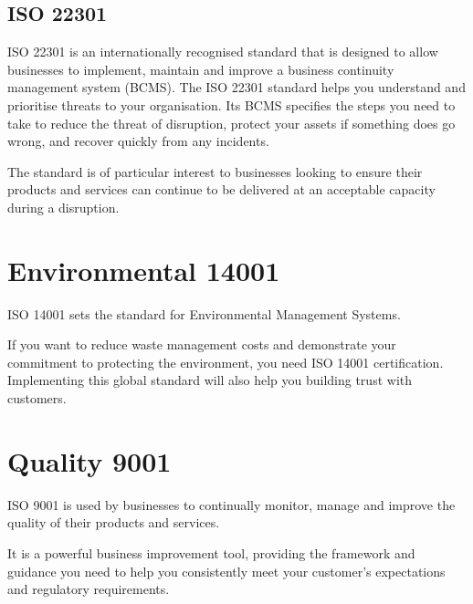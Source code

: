 \documentclass[a4paper,12pt]{article}
\begin{document}
\subsection{ISO 22301}

ISO 22301 is an internationally recognised standard that is designed to allow businesses to implement, maintain and improve a business continuity management system (BCMS). The ISO 22301 standard helps you understand and prioritise threats to your organisation. Its BCMS specifies the steps you need to take to reduce the threat of disruption, protect your assets if something does go wrong, and recover quickly from any incidents.

The standard is of particular interest to businesses looking to ensure their products and services can continue to be delivered at an acceptable capacity during a disruption.

\section{Environmental 14001}
ISO 14001 sets the standard for Environmental Management Systems.

If you want to reduce waste management costs and demonstrate your commitment to protecting the environment, you need ISO 14001 certification. Implementing this global standard will also help you building trust with customers.

\section{Quality 9001}
ISO 9001 is used by businesses to continually monitor, manage and improve the quality of their products and services.

It is a powerful business improvement tool, providing the framework and guidance you need to help you consistently meet your customer’s expectations and regulatory requirements.

\clearpage

\printindex
\end{document}
